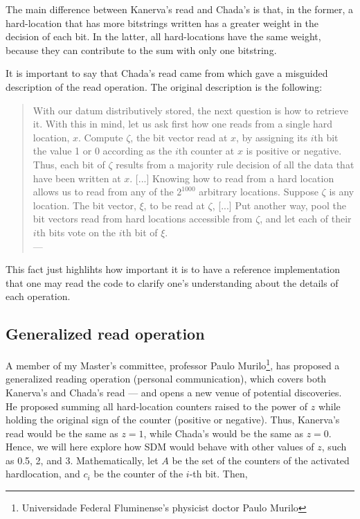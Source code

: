 The main difference between Kanerva's read and Chada's is that, in the former, a hard-location that has more bitstrings written has a greater weight in the decision of each bit. In the latter, all hard-locations have the same weight, because they can contribute to the sum with only one bitstring.

It is important to say that Chada's read came from \citet{anwar2003sparse} which gave a misguided description of the read operation. The original description is the following:

\begin{samepage}
\begin{quote}
With our datum distributively stored, the next question is how to retrieve it. With this in mind, let us ask first how one reads from a single hard location, $x$. Compute $\zeta$, the bit vector read at $x$, by assigning its $i$th bit the value 1 or 0 according as the $i$th counter at $x$ is positive or negative. Thus, each bit of $\zeta$ results from a majority rule decision of all the data that have been written at $x$. [...] Knowing how to read from a hard location allows us to read from any of the $2^{1000}$ arbitrary locations. Suppose $\zeta$ is any location. The bit vector, $\xi$, to be read at $\zeta$, [...] Put another way, pool the bit vectors read from hard locations accessible from $\zeta$, and let each of their $i$th bits vote on the $i$th bit of $\xi$. \\
\hfill --- \citet[p.342]{anwar2003sparse}
\end{quote}
\end{samepage}

This fact just highlihts how important it is to have a reference implementation that one may read the code to clarify one's understanding about the details of each operation.

\subsection{Generalized read operation}

A member of my Master's committee, professor Paulo Murilo\footnote{Universidade Federal Fluminense's physicist doctor Paulo Murilo}, has proposed a generalized reading operation (personal communication), which covers both Kanerva's and Chada's read --- and opens a new venue of potential discoveries. He proposed summing all hard-location counters raised to the power of $z$ while holding the original sign of the counter (positive or negative). Thus, Kanerva's read would be the same as $z=1$, while Chada's would be the same as $z=0$. Hence, we will here explore how SDM would behave with other values of $z$, such as 0.5, 2, and 3. Mathematically, let $A$ be the set of the counters of the activated hardlocation, and $c_i$ be the counter of the $i$-th bit. Then,

